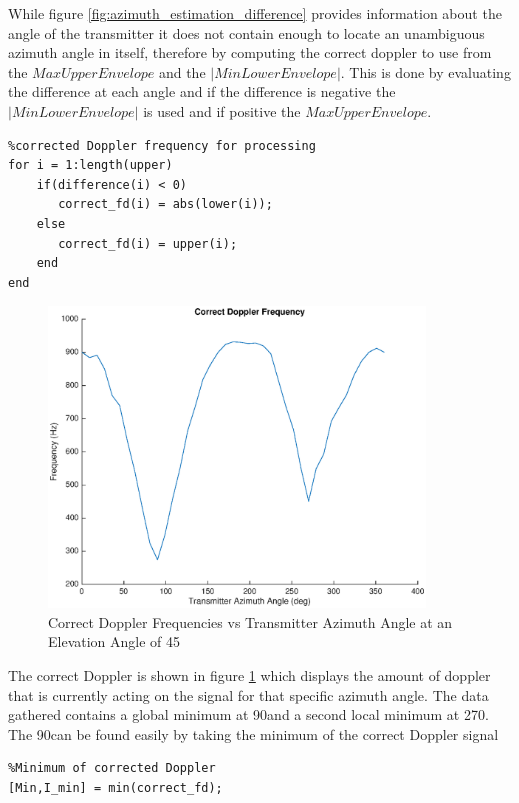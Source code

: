 While figure \ref{fig:azimuth_estimation_difference} provides information about the angle of the transmitter it does not contain enough to locate an unambiguous azimuth angle in itself, therefore by computing the correct doppler to use from the $Max Upper Envelope$ and the $| Min Lower Envelope |$. This is done by evaluating the difference at each angle and if the difference is negative the $| Min Lower Envelope |$ is used and if positive the $Max Upper Envelope$.

\begin{lstlisting}
%corrected Doppler frequency for processing
for i = 1:length(upper)
    if(difference(i) < 0)
       correct_fd(i) = abs(lower(i));
    else
       correct_fd(i) = upper(i);
    end
end
\end{lstlisting}

\begin{figure}
	\begin{center}
		\includegraphics[width=10cm]{images/results/Correct_doppler.eps}
		\caption{Correct Doppler Frequencies vs Transmitter Azimuth Angle at an Elevation Angle of 45\textdegree}
		\label{fig:correct_fd}
	\end{center}
\end{figure}

The correct Doppler is shown in figure \ref{fig:correct_fd} which displays the amount of doppler that is currently acting on the signal for that specific azimuth angle. The data gathered contains a global minimum at 90\textdegree \space and a second local minimum at 270\textdegree. The 90\textdegree \space can be found easily by taking the minimum of the correct Doppler signal

\begin{lstlisting}
%Minimum of corrected Doppler
[Min,I_min] = min(correct_fd);
\end{lstlisting}

